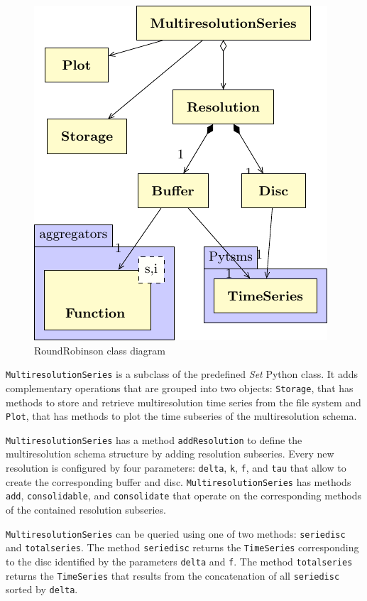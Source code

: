 \begin{figure}[tp]
  \centering
  \includegraphics{fig_roundrobinson_uml.pdf}
  \caption{RoundRobinson  class diagram}
  \label{fig:implementacio:roundrobinson-uml}
\end{figure}


\texttt{MultiresolutionSeries} is a subclass of the predefined
\emph{Set} Python class. It adds complementary operations that are
grouped into two objects: \texttt{Storage}, that has methods to store
and retrieve multiresolution time series from the file system and
\texttt{Plot}, that has methods to plot the time subseries of the
multiresolution schema.


\texttt{MultiresolutionSeries} has a method \texttt{addResolution} to
define the multiresolution schema structure by adding resolution
subseries. Every new resolution is configured by four parameters:
\texttt{delta}, \texttt{k}, \texttt{f}, and \texttt{tau} that allow to
create the corresponding buffer and disc.
\texttt{MultiresolutionSeries} has methods \texttt{add},
\texttt{consolidable}, and \texttt{consolidate} that operate on the
corresponding methods of the contained resolution subseries.


\texttt{MultiresolutionSeries} can be queried using one of two
methods: \texttt{seriedisc} and \texttt{totalseries}. The method
\texttt{seriedisc} returns the \texttt{TimeSeries} corresponding to
the disc identified by the parameters \texttt{delta} and
\texttt{f}. The method \texttt{totalseries} returns the \texttt{TimeSeries} that
results from the concatenation of all \texttt{seriedisc} sorted by
\texttt{delta}.

